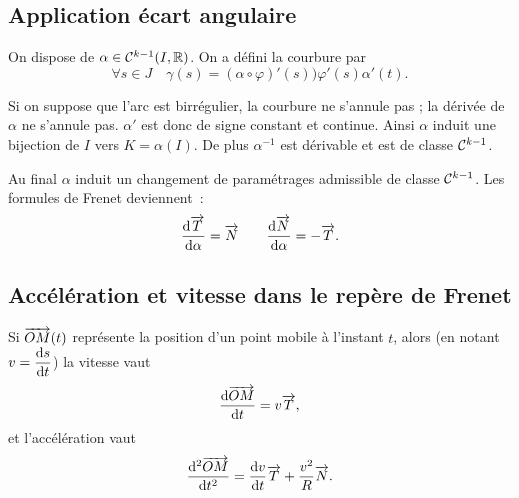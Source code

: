 \subsection{Application écart angulaire}

On dispose de \(\alpha \in \mathcal{C}^{k-1}(I, \mathbb{R})\). On a défini la courbure par
\begin{equation}
  \forall s \in J \quad \gamma(s) = (\alpha \circ \varphi)'(s) ) \varphi'(s)\alpha'(t).
\end{equation}

Si on suppose que l'arc est birrégulier, la courbure ne s'annule pas ; la dérivée de \(\alpha\) ne s'annule pas. \(\alpha'\) est donc de signe constant et continue. Ainsi \(\alpha\) induit une bijection de \(I\) vers \(K=\alpha(I)\). De plus \(\alpha^{-1}\) est dérivable et est de classe \(\mathcal{C}^{k-1}\). 

Au final \(\alpha\) induit un changement de paramétrages admissible de classe \(\mathcal{C}^{k-1}\). Les formules de Frenet deviennent~:
\begin{equation}
  \dfrac{\mathrm{d} \overrightarrow{T}}{\mathrm{d} \alpha}=\overrightarrow{N} \qquad \dfrac{\mathrm{d} \overrightarrow{N}}{\mathrm{d} \alpha}=-\overrightarrow{T}.
\end{equation}

\subsection{Accélération et vitesse dans le repère de Frenet}

Si \(\overrightarrow{OM}(t)\) représente la position d'un point mobile à l'instant \(t\), alors (en notant\(v=\dfrac{\mathrm{d} s}{\mathrm{d} t}\)) la vitesse vaut
\begin{equation}
  \dfrac{\mathrm{d} \overrightarrow{OM}}{\mathrm{d} t} = v \overrightarrow{T},
\end{equation}
et l'accélération vaut
\begin{equation}
  \dfrac{\mathrm{d}^2 \overrightarrow{OM}}{\mathrm{d} {t}^2} = \dfrac{\mathrm{d} v}{\mathrm{d} t} \overrightarrow{T} + \frac{v^2}{R} \overrightarrow{N}.
\end{equation}

